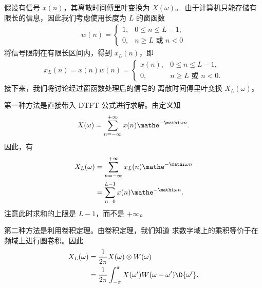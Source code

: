 假设有信号 $x(n)$，其离散时间傅里叶变换为 $X(\omega)$。
由于计算机只能存储有限长的信息，因此我们考虑使用长度为 $L$ 的窗函数
\begin{align*}
    w(n) = \begin{cases}
        1, & 0 \le n \le L-1, \\
        0, & n \ge L \text{ 或 } n < 0
    \end{cases}
\end{align*}
将信号限制在有限长区间内，得到 $x_L(n)$，即
\begin{align*}
    x_L(n) = x(n)w(n) = \begin{cases}
        x(n), & 0 \le n \le L-1, \\
        0, & n \ge L \text{ 或 } n < 0.
    \end{cases}
\end{align*}
接下来，我们将讨论经过窗函数处理后的信号的
离散时间傅里叶变换 $X_L(\omega)$。

\begin{example}
    第一种方法是直接带入 DTFT 公式进行求解。由定义知
    \begin{align*}
        X(\omega) = \sum_{n = -\infty}^{+\infty}x(n)\mathe^{-\mathi\omega n}.
    \end{align*}
    因此，有
    \begin{align*}
        X_L(\omega) & = \sum_{n = -\infty}^{+\infty}x_L(n)\mathe^{-\mathi\omega n} \\
        & = \sum_{n = 0}^{L-1}x(n)\mathe^{-\mathi\omega n}.
    \end{align*}
    注意此时求和的上限是 $L-1$，而不是 $+\infty$。
\end{example}

\begin{example}
    第二种方法是利用卷积定理。由卷积定理，我们知道
    求数字域上的乘积等价于在频域上进行圆卷积。因此
    \begin{align*}
        X_L(\omega) & = \frac{1}{2\pi}X(\omega) \otimes W(\omega) \\
        & = \frac{1}{2\pi}\int_{-\pi}^{\pi}X(\omega')W(\omega - \omega')\D{\omega'}.
    \end{align*}
\end{example}

